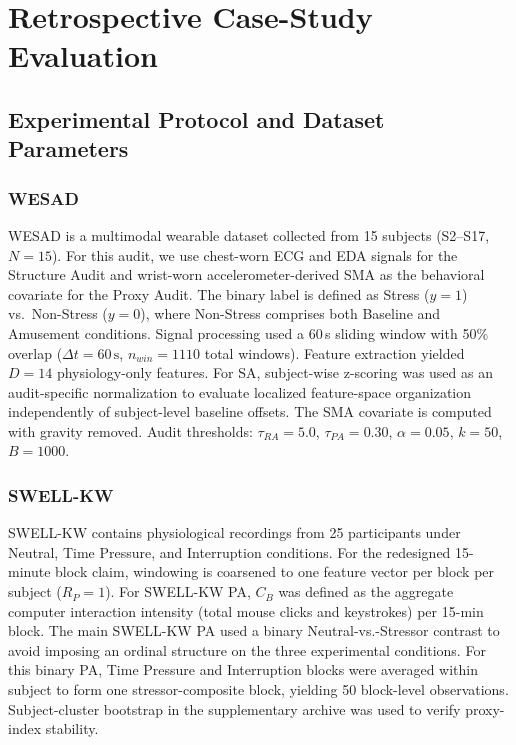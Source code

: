 \documentclass[journal]{IEEEtran}
\begin{document}
\FloatBarrier
\section{Retrospective Case-Study Evaluation}

\subsection{Experimental Protocol and Dataset Parameters}

\subsubsection{WESAD}
WESAD \cite{wesad2018} is a multimodal wearable dataset collected from 15 subjects (S2--S17, $N=15$). For this audit, we use chest-worn ECG and EDA signals for the Structure Audit and wrist-worn accelerometer-derived SMA as the behavioral covariate for the Proxy Audit. The binary label is defined as Stress ($y=1$) vs.~Non-Stress ($y=0$), where Non-Stress comprises both Baseline and Amusement conditions. Signal processing used a 60\,s sliding window with 50\% overlap ($\Delta t = 60\,\text{s}$, $n_{win} = 1110$ total windows). Feature extraction yielded $D=14$ physiology-only features. For SA, subject-wise z-scoring was used as an audit-specific normalization to evaluate localized feature-space organization independently of subject-level baseline offsets. The SMA covariate is computed with gravity removed. Audit thresholds: $\tau_{RA}=5.0$, $\tau_{PA}=0.30$, $\alpha=0.05$, $k=50$, $B=1000$.

\subsubsection{SWELL-KW}
SWELL-KW \cite{swell2014} contains physiological recordings from 25 participants under Neutral, Time Pressure, and Interruption conditions. For the redesigned 15-minute block claim, windowing is coarsened to one feature vector per block per subject ($R_P = 1$). For SWELL-KW PA, $C_B$ was defined as the aggregate computer interaction intensity (total mouse clicks and keystrokes) per 15-min block. The main SWELL-KW PA used a binary Neutral-vs.-Stressor contrast to avoid imposing an ordinal structure on the three experimental conditions. For this binary PA, Time Pressure and Interruption blocks were averaged within subject to form one stressor-composite block, yielding 50 block-level observations. Subject-cluster bootstrap in the supplementary archive was used to verify proxy-index stability.
\end{document}
